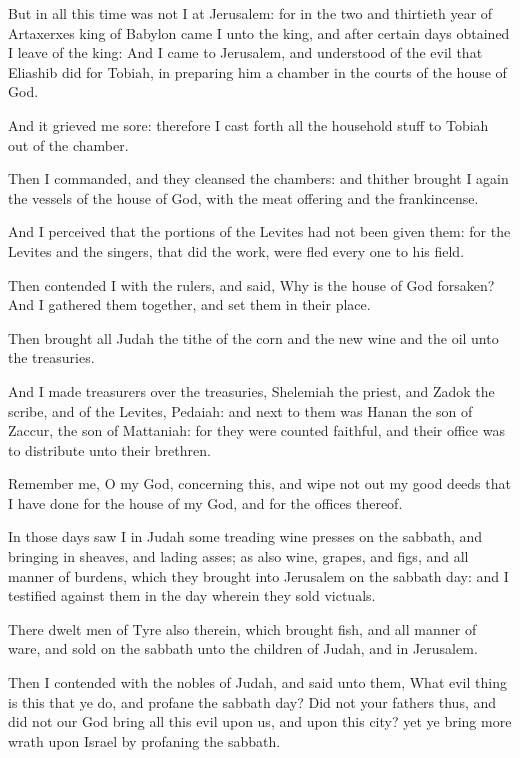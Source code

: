 \Verse But in all this time was not I at Jerusalem: for in the two and thirtieth year of Artaxerxes king of Babylon came I unto the king, and after certain days obtained I leave of the king: \Verse And I came to Jerusalem, and understood of the evil that Eliashib did for Tobiah, in preparing him a chamber in the courts of the house of God.

\Verse And it grieved me sore: therefore I cast forth all the household stuff to Tobiah out of the chamber.

\Verse Then I commanded, and they cleansed the chambers: and thither brought I again the vessels of the house of God, with the meat offering and the frankincense.

\Verse And I perceived that the portions of the Levites had not been given them: for the Levites and the singers, that did the work, were fled every one to his field.

\Verse Then contended I with the rulers, and said, Why is the house of God forsaken? And I gathered them together, and set them in their place.

\Verse Then brought all Judah the tithe of the corn and the new wine and the oil unto the treasuries.

\Verse And I made treasurers over the treasuries, Shelemiah the priest, and Zadok the scribe, and of the Levites, Pedaiah: and next to them was Hanan the son of Zaccur, the son of Mattaniah: for they were counted faithful, and their office was to distribute unto their brethren.

\Verse Remember me, O my God, concerning this, and wipe not out my good deeds that I have done for the house of my God, and for the offices thereof.

\Verse In those days saw I in Judah some treading wine presses on the sabbath, and bringing in sheaves, and lading asses; as also wine, grapes, and figs, and all manner of burdens, which they brought into Jerusalem on the sabbath day: and I testified against them in the day wherein they sold victuals.

\Verse There dwelt men of Tyre also therein, which brought fish, and all manner of ware, and sold on the sabbath unto the children of Judah, and in Jerusalem.

\Verse Then I contended with the nobles of Judah, and said unto them, What evil thing is this that ye do, and profane the sabbath day?  \Verse Did not your fathers thus, and did not our God bring all this evil upon us, and upon this city? yet ye bring more wrath upon Israel by profaning the sabbath.

